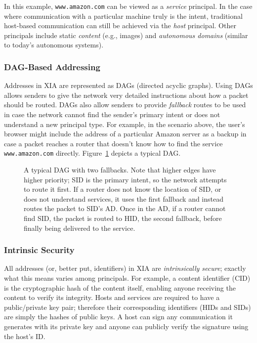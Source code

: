\documentclass{article}
\newcommand{\entrynode}[1]{
  \SetVertexNormal[Shape      = circle,
                   FillColor  = black,
                   LineWidth  = 0pt,
                   MinSize    = 0pt]
  \Vertex[L={\tiny\,}]{#1}
  \SetVertexNormal[Shape      = circle,
                   FillColor  = white,
                   LineWidth  = 2pt]
}
\begin{document}
In this example, \texttt{www.amazon.com} can be viewed as a \emph{service} principal. In the case where communication with a particular machine truly is the intent, traditional host-based communication can still be achieved via the \emph{host} principal. Other principals include static \emph{content} (e.g., images) and \emph{autonomous domains} (similar to today's autonomous systems).

\subsubsection{DAG-Based Addressing}
Addresses in XIA are represented as DAGs (directed acyclic graphs). Using DAGs allows senders to give the network very detailed instructions about how a packet should be routed. DAGs also allow senders to provide {\em fallback} routes to be used in case the network cannot find the sender's primary intent or does not understand a new principal type. For example, in the scenario above, the user's browser might include the address of a particular Amazon server as a backup in case a packet reaches a router that doesn't know how to find the service \texttt{www.amazon.com} directly. Figure~\ref{fig:proxy-service} depicts a typical DAG.

\begin{figure}
\centering
{}
\caption{A typical DAG with two fallbacks. Note that higher edges have higher priority; SID is the primary intent, so the network attempts to route it first. If a router does not know the location of SID, or does not understand services, it uses the first fallback and instead routes the packet to SID's AD. Once in the AD, if a router cannot find SID, the packet is routed to HID, the second fallback, before finally being delivered to the service.}
\label{fig:proxy-service}
\end{figure}


\subsubsection{Intrinsic Security}
All addresses (or, better put, identifiers) in XIA are \emph{intrinsically secure}; exactly what this means varies among principals. For example, a content identifier (CID) is the cryptographic hash of the content itself, enabling anyone receiving the content to verify its integrity. Hosts and services are required to have a public/private key pair; therefore their corresponding identifiers (HIDs and SIDs) are simply the hashes of public keys. A host can sign any communication it generates with its private key and anyone can publicly verify the signature using the host's ID.
\end{document}
